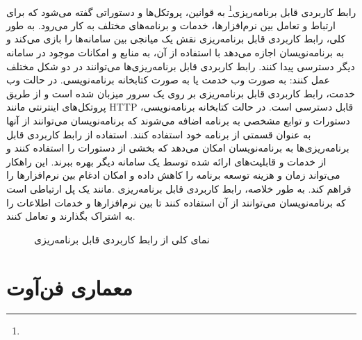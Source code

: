 \paragraph{}
{
    رابط کاربردی قابل برنامه‌ریزی\footnote{} به قوانین، پروتکل‌ها و دستوراتی گفته می‌شود که برای ارتباط و 
    تعامل بین نرم‌افزارها، خدمات و برنامه‌های مختلف به کار می‌رود. به طور کلی، رابط کاربردی قابل برنامه‌ریزی نقش یک میانجی بین سامانه‌ها را بازی
    می‌کند و به برنامه‌نویسان اجازه می‌دهد با استفاده از آن، به منابع و امکانات موجود در سامانه دیگر دسترسی پیدا کنند. رابط کاربردی قابل برنامه‌ریزی‌ها
    می‌توانند در دو شکل مختلف عمل کنند: به صورت وب خدمت یا به صورت کتابخانه برنامه‌نویسی. در حالت وب خدمت، رابط کاربردی قابل برنامه‌ریزی بر روی
    یک سرور میزبان شده است و از طریق پروتکل‌های اینترنتی مانند HTTP قابل دسترسی است. در حالت کتابخانه برنامه‌نویسی، دستورات و توابع مشخصی به
    برنامه اضافه می‌شوند که برنامه‌نویسان می‌توانند از آنها به عنوان قسمتی از برنامه خود استفاده کنند. استفاده از رابط کاربردی قابل برنامه‌ریزی‌ها
    به برنامه‌نویسان امکان می‌دهد که بخشی از دستورات را استفاده کنند و از خدمات و قابلیت‌های ارائه شده توسط یک سامانه دیگر بهره ببرند. این 
    راهکار می‌تواند زمان و هزینه توسعه برنامه را کاهش داده و امکان ادغام بین نرم‌افزارها را فراهم کند. به طور خلاصه، رابط کاربردی قابل برنامه‌ریزی
    .مانند یک پل ارتباطی است که برنامه‌نویسان می‌توانند از آن استفاده کنند تا بین نرم‌افزارها و خدمات اطلاعات را به اشتراک بگذارند و تعامل کنند.
    \begin{figure}[H]
        \caption{نمای کلی از رابط کاربردی قابل برنامه‌ریزی}
        \label{fig:api}
    \end{figure}
}

\section{معماری فن‌آوت}
\label{sec:fanout}
